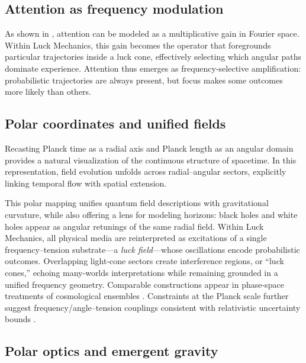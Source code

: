 \documentclass[12pt]{article}
\theoremstyle{plain}
\theoremstyle{definition}
\begin{document}
\subsection{Attention as frequency modulation}

As shown in \citet{ashiru2024frequencies}, attention can be modeled as a 
multiplicative gain in Fourier space. Within Luck Mechanics, this gain becomes 
the operator that foregrounds particular trajectories inside a luck cone, 
effectively selecting which angular paths dominate experience. Attention thus 
emerges as frequency-selective amplification: probabilistic trajectories are 
always present, but focus makes some outcomes more likely than others.

\subsection{Polar coordinates and unified fields}

Recasting Planck time as a radial axis and Planck length as an angular domain 
\citep{PlanckUnits,PolarCoords} provides a natural visualization of the 
continuous structure of spacetime. In this representation, field evolution 
unfolds across radial–angular sectors, explicitly linking temporal flow with 
spatial extension.  

This polar mapping unifies quantum field descriptions with gravitational 
curvature, while also offering a lens for modeling horizons: black holes and 
white holes appear as angular retunings of the same radial field. Within Luck 
Mechanics, all physical media are reinterpreted as excitations of a single 
frequency–tension substrate—a \emph{luck field}—whose oscillations encode 
probabilistic outcomes. Overlapping light-cone sectors create interference 
regions, or ``luck cones,'' echoing many-worlds interpretations while remaining 
grounded in a unified frequency geometry. Comparable constructions appear in 
phase-space treatments of cosmological ensembles \citep{GibbonsTurok2006}. 
Constraints at the Planck scale further suggest frequency/angle–tension couplings 
consistent with relativistic uncertainty bounds \citep{PhysRevResearch033343}.

\subsection{Polar optics and emergent gravity}
\end{document}
